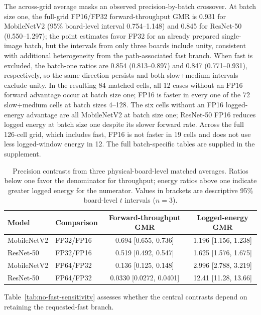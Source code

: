 \documentclass[electronics,article,submit,pdftex,moreauthors]{Definitions/mdpi}
\newcommand{\mobile}{MobileNetV2}
\newcommand{\resnet}{ResNet-50}
\renewcommand{\tabref}[1]{Table~\ref{#1}}
\begin{document}
The across-grid average masks an observed precision-by-batch crossover. At batch size one, the full-grid FP16/FP32 forward-throughput GMR is 0.931 for \mobile{} (95\% board-level interval 0.754--1.148) and 0.845 for \resnet{} (0.550--1.297); the point estimates favor FP32 for an already prepared single-image batch, but the intervals from only three boards include unity, consistent with additional heterogeneity from the path-associated fast branch. When fast is excluded, the batch-one ratios are 0.854 (0.813--0.897) and 0.847 (0.771--0.931), respectively, so the same direction persists and both slow+medium intervals exclude unity. In the resulting 84 matched cells, all 12 cases without an FP16 forward advantage occur at batch size one; FP16 is faster in every one of the 72 slow+medium cells at batch sizes 4--128. The six cells without an FP16 logged-energy advantage are all \mobile{} at batch size one; \resnet{} FP16 reduces logged energy at batch size one despite its slower forward rate. Across the full 126-cell grid, which includes fast, FP16 is not faster in 19 cells and does not use less logged-window energy in 12. The full batch-specific tables are supplied in the supplement.

\begin{table}[t]
\caption{Precision contrasts from three physical-board-level matched averages. Ratios below one favor the denominator for throughput; energy ratios above one indicate greater logged energy for the numerator. Values in brackets are descriptive 95\% board-level $t$ intervals ($n=3$).}
\label{tab:precision-contrasts}
\centering
\small
\begin{tabular}{llcc}
\toprule
Model & Comparison & Forward-throughput GMR & Logged-energy GMR \\
\midrule
\mobile{} & FP32/FP16 & 0.694 [0.655, 0.736] & 1.196 [1.156, 1.238] \\
\resnet{} & FP32/FP16 & 0.519 [0.492, 0.547] & 1.625 [1.576, 1.675] \\
\mobile{} & FP64/FP32 & 0.136 [0.125, 0.148] & 2.996 [2.788, 3.219] \\
\resnet{} & FP64/FP32 & 0.0330 [0.0272, 0.0401] & 12.41 [11.28, 13.66] \\
\bottomrule
\end{tabular}
\end{table}

\tabref{tab:no-fast-sensitivity} assesses whether the central contrasts depend on retaining the requested-fast branch.
\end{document}

